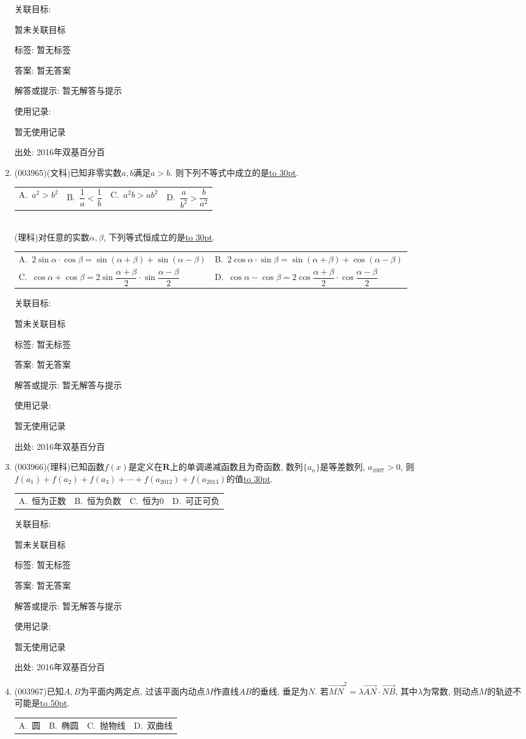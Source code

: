 \documentclass[10pt,a4paper]{article}
\newcommand{\blank}[1]{\underline{\hbox to #1pt{}}}
\newcommand{\twoch}[4]{\par\begin{tabular}{p{.46\textwidth}p{.46\textwidth}}
A.~#1& B.~#2\\
C.~#3& D.~#4
\end{tabular}}
\newcommand{\fourch}[4]{\par\begin{tabular}{p{.23\textwidth}p{.23\textwidth}p{.23\textwidth}p{.23\textwidth}}
A.~#1 &B.~#2& C.~#3& D.~#4
\end{tabular}}
\begin{document}
\begin{enumerate}[1.]
关联目标:

暂未关联目标



标签: 暂无标签

答案: 暂无答案

解答或提示: 暂无解答与提示

使用记录:

暂无使用记录


出处: 2016年双基百分百
\item { (003965)}(文科)已知非零实数$a,b$满足$a>b$. 则下列不等式中成立的是\blank{30}.
\fourch{$a^2>b^2$}{$\dfrac 1a<\dfrac 1b$}{$a^2b>ab^2$}{$\dfrac{a}{b^2}>\dfrac{b}{a^2}$}\\
(理科)对任意的实数$\alpha,\beta$, 下列等式恒成立的是\blank{30}.
\twoch{$2\sin\alpha\cdot\cos\beta=\sin(\alpha+\beta)+\sin(\alpha-\beta)$}{$2\cos\alpha\cdot\sin\beta=\sin(\alpha+\beta)+\cos(\alpha-\beta)$}{$\cos\alpha+\cos\beta=2\sin\dfrac{\alpha+\beta}{2}\cdot\sin\dfrac{\alpha-\beta}{2}$}{$\cos\alpha-\cos\beta=2\cos\dfrac{\alpha+\beta}{2}\cdot\cos\dfrac{\alpha-\beta}{2}$}


关联目标:

暂未关联目标



标签: 暂无标签

答案: 暂无答案

解答或提示: 暂无解答与提示

使用记录:

暂无使用记录


出处: 2016年双基百分百
\item { (003966)}(理科)已知函数$f(x)$是定义在$\mathbf{R}$上的单调递减函数且为奇函数, 数列$\{a_n\}$是等差数列, $a_{1007}>0$, 则$f(a_1)+f(a_2)+f(a_3)+\cdots+f(a_{2012})+f(a_{2013})$的值\blank{30}.
\fourch{恒为正数}{恒为负数}{恒为$0$}{可正可负}


关联目标:

暂未关联目标



标签: 暂无标签

答案: 暂无答案

解答或提示: 暂无解答与提示

使用记录:

暂无使用记录


出处: 2016年双基百分百
\item { (003967)}已知$A,B$为平面内两定点, 过该平面内动点$M$作直线$AB$的垂线, 垂足为$N$. 若$\overrightarrow{MN}^2=\lambda \overrightarrow{AN}\cdot\overrightarrow{NB}$, 其中$\lambda$为常数, 则动点$M$的轨迹不可能是\blank{50}.
\fourch{圆}{椭圆}{抛物线}{双曲线}



\end{enumerate}
\end{document}
